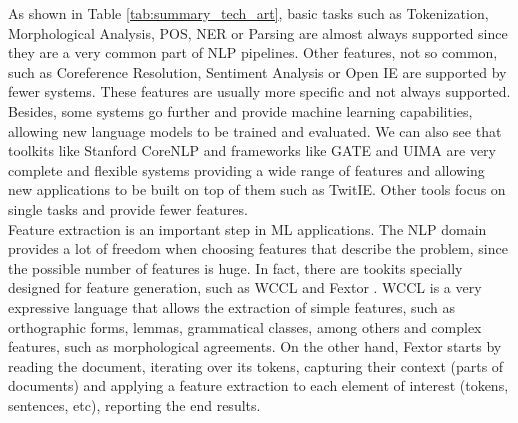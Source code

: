 As shown in Table \ref{tab:summary_tech_art}, basic tasks such as Tokenization, Morphological Analysis, POS, NER or Parsing are almost always supported since they are a very common part of NLP pipelines.  Other features, not so common, such as Coreference Resolution, Sentiment Analysis or Open IE are supported by fewer systems. These features are usually more specific and not always supported. Besides, some systems go further and provide machine learning capabilities, allowing new language models to be trained and evaluated. We can also see that toolkits like Stanford CoreNLP and frameworks like GATE and UIMA are very complete and flexible systems providing a wide range of features and allowing new applications to be built on top of them such as TwitIE. Other tools focus on single tasks and provide fewer features. \\
Feature extraction is an important step in ML applications. The NLP domain provides a lot of freedom when choosing features that describe the problem, since the possible number of features is huge. In fact,  there are tookits specially designed for feature generation, such as WCCL \citep{Radziszewski2011WCCL} and Fextor \citep{Broda2013Fextor}. WCCL  is a very expressive language that allows the extraction of simple features, such as orthographic forms, lemmas, grammatical classes, among others and complex features, such as morphological agreements. On the other hand, Fextor starts by reading the document, iterating over its tokens, capturing their context (parts of documents) and applying a feature extraction to each element of interest (tokens, sentences, etc), reporting the end results.  \\


